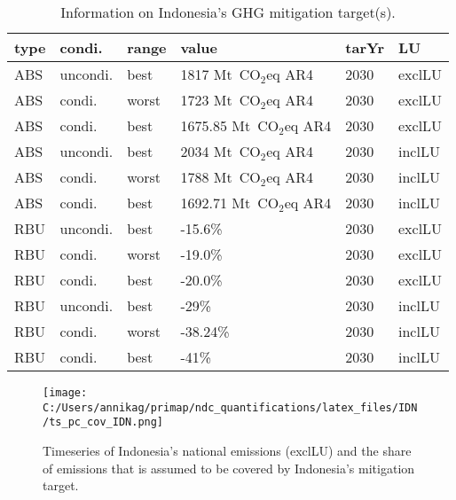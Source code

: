 \documentclass[12pt]{article}
\begin{document}
 \begin{table}[H]
 \centering
 \caption{Information on Indonesia's GHG mitigation target(s).}
 \label{tab:mitiTars}
 \begin{tabular}{l l l l l l }
 \bfseries type & \bfseries condi. & \bfseries range & \bfseries value & \bfseries tarYr & \bfseries LU \tabularnewline \hline \hline
 ABS & uncondi. & best & 1817 Mt~CO$_2$eq AR4 & 2030 & exclLU \tabularnewline 
 ABS & condi. & worst & 1723 Mt~CO$_2$eq AR4 & 2030 & exclLU \tabularnewline 
 ABS & condi. & best & 1675.85 Mt~CO$_2$eq AR4 & 2030 & exclLU \tabularnewline 
 ABS & uncondi. & best & 2034 Mt~CO$_2$eq AR4 & 2030 & inclLU \tabularnewline 
 ABS & condi. & worst & 1788 Mt~CO$_2$eq AR4 & 2030 & inclLU \tabularnewline 
 ABS & condi. & best & 1692.71 Mt~CO$_2$eq AR4 & 2030 & inclLU \tabularnewline \hline
 RBU & uncondi. & best & -15.6\% & 2030 & exclLU \tabularnewline 
 RBU & condi. & worst & -19.0\% & 2030 & exclLU \tabularnewline 
 RBU & condi. & best & -20.0\% & 2030 & exclLU \tabularnewline 
 RBU & uncondi. & best & -29\% & 2030 & inclLU \tabularnewline 
 RBU & condi. & worst & -38.24\% & 2030 & inclLU \tabularnewline 
 RBU & condi. & best & -41\% & 2030 & inclLU \tabularnewline 
 \end{tabular}
 \end{table}

 \begin{figure}[H]
 \centering
 \texttt{[image: C:/Users/annikag/primap/ndc\_quantifications/latex\_files/IDN/ts\_pc\_cov\_IDN.png]}
 \caption{Timeseries of Indonesia's national emissions (exclLU) and the share of emissions that is assumed to be covered by Indonesia's mitigation target.}
 \label{fig:tsPcCov}
 \end{figure}
\end{document}
